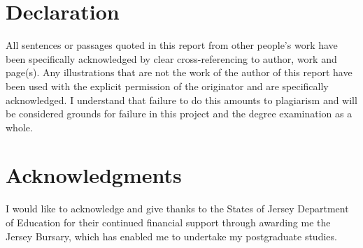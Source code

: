 \documentclass[a4paper,12pt,titlepage,openright]{report}
\begin{document}


\chapter*{Declaration}
All sentences or passages quoted in this report from other people's work have been specifically acknowledged by clear cross-referencing to author, work and page(s). Any illustrations that are not the work of the author of this report have been used with the explicit permission of the originator and are specifically acknowledged. I understand that failure to do this amounts to plagiarism and will be considered grounds for failure in this project and the degree examination as a whole.

\chapter*{Acknowledgments}
I would like to acknowledge and give thanks to the States of Jersey Department of Education for their continued financial support through awarding me the Jersey Bursary, which has enabled me to undertake my postgraduate studies. 
\tableofcontents
\cleardoublepage{}

 







\end{document}
